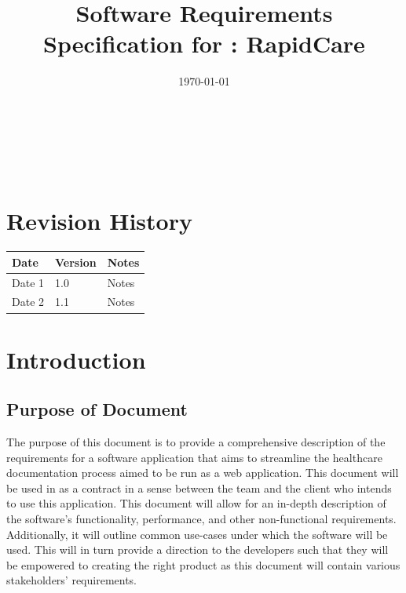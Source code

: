 \documentclass[12pt]{article}
\begin{document}
\title{Software Requirements Specification for \progname: RapidCare}
\author{\authname}
\date{\today}
	
\maketitle

~\newpage


\tableofcontents

~\newpage

\section*{Revision History}

\begin{tabularx}{\textwidth}{p{3cm}p{2cm}X}
\toprule {\bf Date} & {\bf Version} & {\bf Notes}\\
\midrule
Date 1 & 1.0 & Notes\\
Date 2 & 1.1 & Notes\\
\bottomrule
\end{tabularx}

\newpage



\section{Introduction}

\subsection{Purpose of Document}

  The purpose of this document is to provide a comprehensive description of the requirements for a software application that aims to streamline the healthcare documentation process aimed to be run as a web application. This document will be used in as a contract in a sense between the team and the client who intends to use this application. This document will allow for an in-depth description of the software's functionality, performance, and other non-functional requirements. Additionally, it will outline common use-cases under which the software will be used. This will in turn provide a direction to the developers such that they will be empowered to creating the right product as this document will contain various stakeholders' requirements.\\
\end{document}
